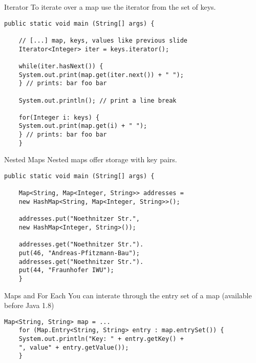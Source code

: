 \begin{frame}[fragile]{Iterator}
	To iterate over a map use the iterator from the set of keys.
	\begin{lstlisting}[basicstyle=\ttfamily\scriptsize]
	public static void main (String[] args) {
	
	// [...] map, keys, values like previous slide    	    
	Iterator<Integer> iter = keys.iterator();
	
	while(iter.hasNext()) {
	System.out.print(map.get(iter.next()) + " ");
	} // prints: bar foo bar
	
	System.out.println(); // print a line break
	
	for(Integer i: keys) {
	System.out.print(map.get(i) + " ");
	} // prints: bar foo bar
	}
	\end{lstlisting}
\end{frame}

\begin{frame}[fragile]{Nested Maps}
	Nested maps offer storage with key pairs.
	\begin{lstlisting}[basicstyle=\ttfamily\scriptsize]
	public static void main (String[] args) {		
	
	Map<String, Map<Integer, String>> addresses = 
	new HashMap<String, Map<Integer, String>>();
	
	addresses.put("Noethnitzer Str.", 
	new HashMap<Integer, String>());
	
	addresses.get("Noethnitzer Str.").
	put(46, "Andreas-Pfitzmann-Bau");
	addresses.get("Noethnitzer Str.").
	put(44, "Fraunhofer IWU");
	}
	\end{lstlisting}
\end{frame}

\begin{frame}[fragile]{Maps and For Each}
	You can interate through the entry set of a map (available before Java 1.8)
	\begin{lstlisting}[basicstyle=\ttfamily\scriptsize]
	Map<String, String> map = ...
	for (Map.Entry<String, String> entry : map.entrySet()) {
	System.out.println("Key: " + entry.getKey() +
	", value" + entry.getValue());
	}
	\end{lstlisting}
\end{frame}

